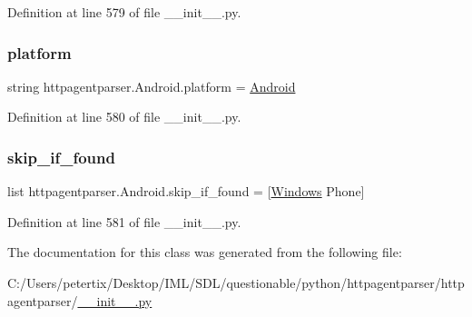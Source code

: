 Definition at line 579 of file \+\_\+\+\_\+init\+\_\+\+\_\+.\+py.

\hypertarget{classhttpagentparser_1_1_android_a1200228e7e9cdbcae82e97c81652c1d5}{}\label{classhttpagentparser_1_1_android_a1200228e7e9cdbcae82e97c81652c1d5} 
\subsubsection{\texorpdfstring{platform}{platform}}
{\footnotesize\ttfamily string httpagentparser.\+Android.\+platform = \textquotesingle{}\hyperlink{classhttpagentparser_1_1_android}{Android}\textquotesingle{}\hspace{0.3cm}{\ttfamily [static]}}



Definition at line 580 of file \+\_\+\+\_\+init\+\_\+\+\_\+.\+py.

\hypertarget{classhttpagentparser_1_1_android_a4e89d0aa94d60f110c32d7ca5cb4f943}{}\label{classhttpagentparser_1_1_android_a4e89d0aa94d60f110c32d7ca5cb4f943} 
\subsubsection{\texorpdfstring{skip\+\_\+if\+\_\+found}{skip\_if\_found}}
{\footnotesize\ttfamily list httpagentparser.\+Android.\+skip\+\_\+if\+\_\+found = \mbox{[}\textquotesingle{}\hyperlink{classhttpagentparser_1_1_windows}{Windows} Phone\textquotesingle{}\mbox{]}\hspace{0.3cm}{\ttfamily [static]}}



Definition at line 581 of file \+\_\+\+\_\+init\+\_\+\+\_\+.\+py.



The documentation for this class was generated from the following file\+:\begin{DoxyCompactItemize}
\item 
C\+:/\+Users/petertix/\+Desktop/\+I\+M\+L/\+S\+D\+L/questionable/python/httpagentparser/httpagentparser/\hyperlink{____init_____8py}{\+\_\+\+\_\+init\+\_\+\+\_\+.\+py}\end{DoxyCompactItemize}
